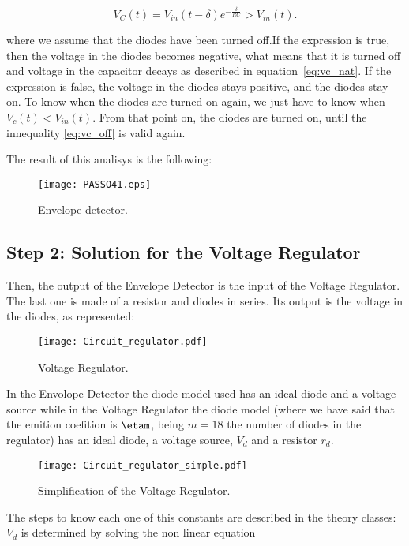 \begin{equation}
  V_{C}(t) = V_{in}(t-\delta) e^{-\frac{\delta}{RC}} > V_{in}(t).
  \label{eq:vc_off}
\end{equation}

where we assume that the diodes have been turned off.If the expression is true, then the voltage in the diodes becomes negative, what means that it is turned off and voltage in the capacitor decays as described in equation~\ref{eq:vc_nat}. If the expression is false, the voltage in the diodes stays positive, and the diodes stay on.
To know when the diodes are turned on again, we just have to know when $V_{c}(t)<V_{in}(t)$. From that point on, the diodes are turned on, until the innequality \ref{eq:vc_off} is valid again.

The result of this analisys is the following:

\begin{figure}[h] \centering
\texttt{[image: PASSO41.eps]}
\caption{Envelope detector.}
\label{fig:TEO_ENV}
\end{figure}

\subsection{Step 2: Solution for the Voltage Regulator}

Then, the output of the Envelope Detector is the input of the Voltage Regulator. The last one is made of a resistor and diodes in series. Its output is the voltage in the diodes, as represented:

\begin{figure}[h] \centering
\texttt{[image: Circuit\_regulator.pdf]}
\caption{Voltage Regulator.}
\label{fig:TEO_VR_CIR}
\end{figure}

In the Envolope Detector the diode model used has an ideal diode and a voltage source while in the Voltage Regulator the diode model (where we have said that the emition coefition is $\etam$, being $m=18$ the number of diodes in the regulator) has an ideal diode, a voltage source, $V_{d}$ and a resistor $r_{d}$. 

\begin{figure}[h] \centering
\texttt{[image: Circuit\_regulator\_simple.pdf]}
\caption{Simplification of the Voltage Regulator.}
\label{fig:TEO_VR_CIR_S}
\end{figure}

The steps to know each one of this constants are described in the theory classes:
$V_{d}$ is determined by solving the non linear equation

